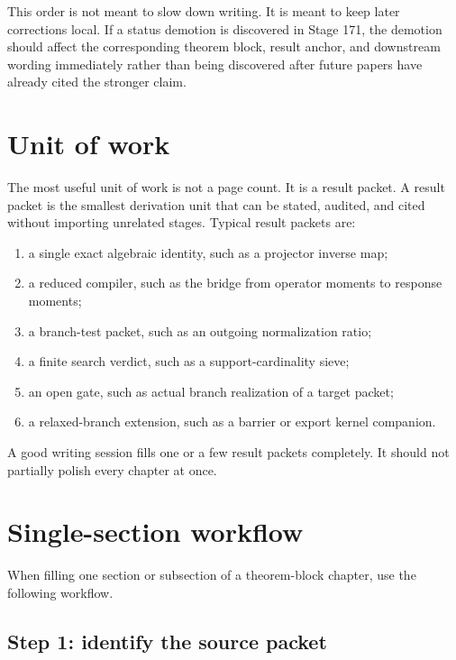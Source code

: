 This order is not meant to slow down writing.  It is meant to keep later corrections local.  If a status demotion is discovered in Stage 171, the demotion should affect the corresponding theorem block, result anchor, and downstream wording immediately rather than being discovered after future papers have already cited the stronger claim.

\section{Unit of work}
\label{sec:fill-unit-of-work}

The most useful unit of work is not a page count.  It is a result packet.  A result packet is the smallest derivation unit that can be stated, audited, and cited without importing unrelated stages.  Typical result packets are:

\begin{enumerate}[leftmargin=2.5em]
\item a single exact algebraic identity, such as a projector inverse map;
\item a reduced compiler, such as the bridge from operator moments to response moments;
\item a branch-test packet, such as an outgoing normalization ratio;
\item a finite search verdict, such as a support-cardinality sieve;
\item an open gate, such as actual branch realization of a target packet;
\item a relaxed-branch extension, such as a barrier or export kernel companion.
\end{enumerate}

A good writing session fills one or a few result packets completely.  It should not partially polish every chapter at once.

\section{Single-section workflow}
\label{sec:single-section-workflow}

When filling one section or subsection of a theorem-block chapter, use the following workflow.

\subsection{Step 1: identify the source packet}
\label{subsec:workflow-identify-source-packet}

